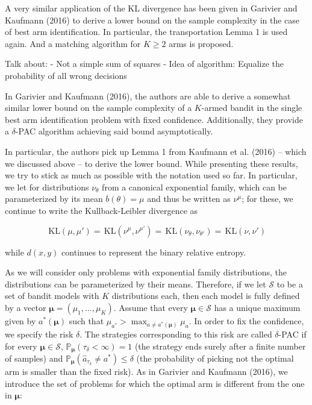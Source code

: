 \documentclass[12pt,]{article}
\newcommand{\KL}{\,\text{KL}}
\begin{document}
A very similar application of the KL divergence has been given in
Garivier and Kaufmann (2016) to derive a lower bound on the sample
complexity in the case of best arm identification. In particular, the
transportation Lemma 1 is used again. And a matching algorithm for
\(K \geq 2\) arms is proposed.

Talk about: - Not a simple sum of squares - Idea of algorithm: Equalize
the probability of all wrong decisions

In Garivier and Kaufmann (2016), the authors are able to derive a
somewhat similar lower bound on the sample complexity of a \(K\)-armed
bandit in the single best arm identification problem with fixed
confidence. Additionally, they provide a \(\delta\)-PAC algorithm
achieving said bound asymptotically.

In particular, the authors pick up Lemma 1 from Kaufmann et al. (2016)
-- which we discussed above -- to derive the lower bound. While
presenting these results, we try to stick as much as possible with the
notation used so far. In particular, we let for distributions
\(\nu_{\theta}\) from a canonical exponential family, which can be
parameterized by its mean \(\stackrel{.}{b}(\theta) = \mu\) and thus be
written as \(\nu^{\mu}\); for these, we continue to write the
Kullback-Leibler divergence as

\begin{equation*}
\KL(\mu, \mu') = \KL(\nu^{\mu},\nu^{\mu'}) = \KL(\nu_{\theta},\nu_{\theta'}) = \KL(\nu, \nu')
\end{equation*}

while \(d(x,y)\) continues to represent the binary relative entropy.

As we will consider only problems with exponential family distributions,
the distributions can be parameterized by their means. Therefore, if we
let \(\mathcal{S}\) to be a set of bandit models with \(K\)
distributions each, then each model is fully defined by a vector
\(\bm{\mu} = (\mu_1, \dots, \mu_K)\). Assume that every
\(\bm{\mu} \in \mathcal{S}\) has a unique maximum given by
\(a^*(\bm{\mu})\) such that
\(\mu_{a^*} > \max_{a \neq a^*(\bm{\mu})} \mu_a\). In order to fix the
confidence, we specify the risk \(\delta\). The strategies corresponding
to this risk are called \(\delta\)-PAC if for every
\(\bm{\mu} \in \mathcal{S}\),
\(\mathbb{P}_{\bm{\mu}}(\tau_{\delta} < \infty) = 1\) (the strategy ends
surely after a finite number of samples) and
\(\mathbb{P}_{\bm{\mu}}(\hat{a}_{\tau_{\delta}} \neq a^*) \leq \delta\)
(the probability of picking not the optimal arm is smaller than the
fixed risk). As in Garivier and Kaufmann (2016), we introduce the set of
problems for which the optimal arm is different from the one in
\(\bm{\mu}\):
\end{document}
